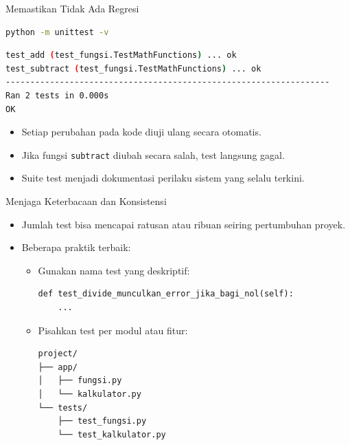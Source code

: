 \documentclass[aspectratio=169, table]{beamer}
\begin{document}
\begin{frame}[fragile]{Memastikan Tidak Ada Regresi}
\vspace*{20pt}
\begin{lstlisting}[language=bash, caption={Menjalankan ulang semua test}]
python -m unittest -v
\end{lstlisting}

\begin{lstlisting}[language=bash, caption={Hasil keluaran}]
test_add (test_fungsi.TestMathFunctions) ... ok
test_subtract (test_fungsi.TestMathFunctions) ... ok
------------------------------------------------------------------
Ran 2 tests in 0.000s
OK
\end{lstlisting}

\begin{itemize}
  \item Setiap perubahan pada kode diuji ulang secara otomatis.
  \item Jika fungsi \texttt{subtract} diubah secara salah, test langsung gagal.
  \item Suite test menjadi dokumentasi perilaku sistem yang selalu terkini.
\end{itemize}
\end{frame}

\begin{frame}[fragile]{Menjaga Keterbacaan dan Konsistensi}
\vspace*{20pt}
\begin{itemize}
  \item Jumlah test bisa mencapai ratusan atau ribuan seiring pertumbuhan proyek.
  \item Beberapa praktik terbaik:
  \begin{itemize}
    \item Gunakan nama test yang deskriptif:
\begin{lstlisting}[style=PythonStyle]
def test_divide_munculkan_error_jika_bagi_nol(self):
    ...
\end{lstlisting}
    \item Pisahkan test per modul atau fitur:
\begin{lstlisting}[language=bash]
project/
├── app/
│   ├── fungsi.py
│   └── kalkulator.py
└── tests/
    ├── test_fungsi.py
    └── test_kalkulator.py
\end{lstlisting}
  \end{itemize}
\end{itemize}
\end{frame}
\end{document}
